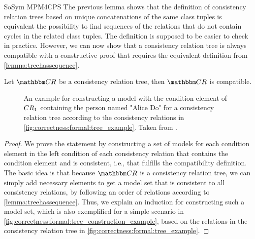 \begin{copiedFrom}{SoSym MPM4CPS}
The previous lemma shows that the definition of consistency relation trees based on unique concatenations of the same class tuples is equivalent the possibility to find sequences of the relations that do not contain cycles in the related class tuples. %
The definition is supposed to be easier to check in practice.
However, we can now show that a consistency relation tree is always compatible with a constructive proof that requires the equivalent definition from \autoref{lemma:treehassequence}.


\begin{theorem} \label{theorem:treecompatibility}
    Let $\consistencyrelationset{CR}$ be a consistency relation tree, then $\consistencyrelationset{CR}$ is compatible.
\end{theorem}

\begin{figure}
    \centering
    
    \caption{An example for constructing a model with the condition element of $CR_{1}$ containing the person named "Alice Do" for a consistency relation tree according to the consistency relations in \autoref{fig:correctness:formal:tree_example}. Taken from .}
    \label{fig:correctness:formal:tree_construction_example}
\end{figure}

\begin{proof}
    We prove the statement by constructing a set of models for each condition element in the left condition of each consistency relation that contains the condition element and is consistent, i.e., that fulfills the compatibility definition.
    The basic idea is that because $\consistencyrelationset{CR}$ is a consistency relation tree, we can simply add necessary elements to get a model set that is consistent to all consistency relations, by %
    following an order of relations according to \autoref{lemma:treehassequence}.
    Thus, we explain an induction for constructing such a model set, which is also exemplified for a simple scenario in \autoref{fig:correctness:formal:tree_construction_example}, based on the relations in the consistency relation tree in \autoref{fig:correctness:formal:tree_example}.
    

\end{proof}
\end{copiedFrom}
